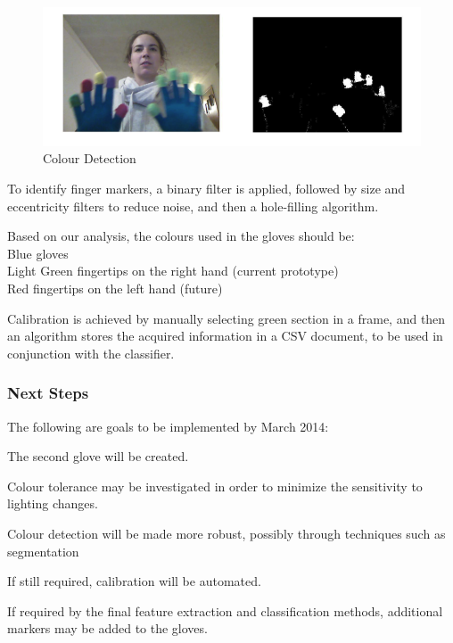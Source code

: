 \documentclass[12pt]{article}
\begin{document}
\begin{figure}[h]
  \centering
  \includegraphics[scale=1]{BinaryTest.png}
  \caption{Colour Detection}
  \label{fig:salience}
\end{figure}

To identify finger markers, a binary filter is applied, followed by size and eccentricity filters to reduce noise, and then a hole-filling algorithm.

Based on our analysis, the colours used in the gloves should be: \\
\hspace*{1cm} Blue gloves \\
\hspace*{1cm} Light Green fingertips on the right hand (current prototype) \\
\hspace*{1cm} Red fingertips on the left hand (future)


Calibration is achieved by manually selecting green section in a frame, and then an algorithm stores the acquired information in a CSV document, to be used in conjunction with the classifier.

\subsubsection{Next Steps}
The following are goals to be implemented by March 2014:
\begin{enumerate*}
	\item The second glove will be created.
	\item Colour tolerance may be investigated in order to minimize the sensitivity to lighting changes.
	\item Colour detection will be made more robust, possibly through techniques such as segmentation
	\item If still required, calibration will be automated. 
	\item If required by the final feature extraction and classification methods, additional markers may be added to the gloves.
\end{enumerate*}
\end{document}
